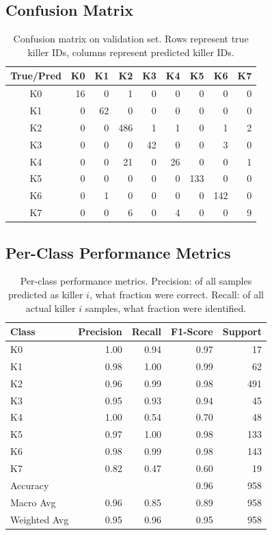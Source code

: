 \documentclass[12pt]{article}
\begin{document}
\subsection{Confusion Matrix}

\begin{table}[h]
\centering
\begin{tabular}{c|rrrrrrrr}
\toprule
\textbf{True/Pred} & K0 & K1 & K2 & K3 & K4 & K5 & K6 & K7 \\
\midrule
K0 & 16 & 0 & 1 & 0 & 0 & 0 & 0 & 0 \\
K1 & 0 & 62 & 0 & 0 & 0 & 0 & 0 & 0 \\
K2 & 0 & 0 & 486 & 1 & 1 & 0 & 1 & 2 \\
K3 & 0 & 0 & 0 & 42 & 0 & 0 & 3 & 0 \\
K4 & 0 & 0 & 21 & 0 & 26 & 0 & 0 & 1 \\
K5 & 0 & 0 & 0 & 0 & 0 & 133 & 0 & 0 \\
K6 & 0 & 1 & 0 & 0 & 0 & 0 & 142 & 0 \\
K7 & 0 & 0 & 6 & 0 & 4 & 0 & 0 & 9 \\
\bottomrule
\end{tabular}
\caption{Confusion matrix on validation set. Rows represent true killer IDs, columns represent predicted killer IDs.}
\label{tab:confusion}
\end{table}

\subsection{Per-Class Performance Metrics}

\begin{table}[h]
\centering
\begin{tabular}{lrrrr}
\toprule
\textbf{Class} & \textbf{Precision} & \textbf{Recall} & \textbf{F1-Score} & \textbf{Support} \\
\midrule
K0 & 1.00 & 0.94 & 0.97 & 17 \\
K1 & 0.98 & 1.00 & 0.99 & 62 \\
K2 & 0.96 & 0.99 & 0.98 & 491 \\
K3 & 0.95 & 0.93 & 0.94 & 45 \\
K4 & 1.00 & 0.54 & 0.70 & 48 \\
K5 & 0.97 & 1.00 & 0.98 & 133 \\
K6 & 0.98 & 0.99 & 0.98 & 143 \\
K7 & 0.82 & 0.47 & 0.60 & 19 \\
\midrule
Accuracy &  &  & 0.96 & 958 \\
Macro Avg & 0.96 & 0.85 & 0.89 & 958 \\
Weighted Avg & 0.95 & 0.96 & 0.95 & 958 \\
\bottomrule
\end{tabular}
\caption{Per-class performance metrics. Precision: of all samples predicted as killer $i$, what fraction were correct. Recall: of all actual killer $i$ samples, what fraction were identified.}
\label{tab:classification_report}
\end{table}
\end{document}
